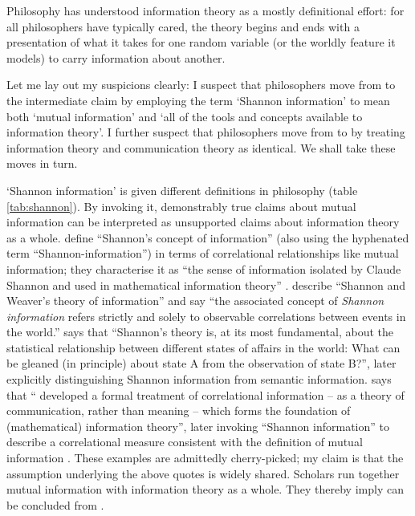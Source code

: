 \documentclass[12pt]{article}
\begin{document}
\begin{myquote}
Philosophy has understood information theory as a mostly definitional effort: for all philosophers have typically cared, the theory begins and ends with a presentation of what it takes for one random variable (or the worldly feature it models) to carry information about another.
\par\hspace*{\fill}\citet[1216]{martinez2019representations}
\end{myquote}

\noindent Let me lay out my suspicions clearly: I suspect that philosophers move from \ami{} to the intermediate claim \ait{} by employing the term `Shannon information' to mean both `mutual information' and `all of the tools and concepts available to information theory'.
I further suspect that philosophers move from \ait{} to \act{} by treating information theory and communication theory as identical.
We shall take these moves in turn.

`Shannon information' is given different definitions in philosophy (table \ref{tab:shannon}).
By invoking it, demonstrably true claims about mutual information can be interpreted as unsupported claims about information theory as a whole.
\citet[$\S$2]{godfrey-smith2016biological} define ``Shannon's concept of information'' (also using the hyphenated term ``Shannon-information'') in terms of correlational relationships like mutual information; they characterise it as ``the sense of information isolated by Claude Shannon and used in mathematical information theory'' \citep[1]{godfrey-smith2016biological}.
\citet[759]{owren2010redefining} describe ``Shannon and Weaver's \parencite*{shannon1949mathematical} theory of information'' and say ``the associated concept of \textit{Shannon information} refers strictly and solely to observable correlations between events in the world.''
\citet[106]{dennett2017bacteria} says that ``Shannon's theory is, at its most fundamental, about the statistical relationship between different states of affairs in the world: What can be gleaned (in principle) about state A from the observation of state B?'', later explicitly distinguishing Shannon information from semantic information.
\citet[p. 12, n. 11]{shea2018representation} says that ``\citet{shannon1948mathematicalc} developed a formal treatment of correlational information -- as a theory of communication, rather than meaning -- which forms the foundation of (mathematical) information theory'', later invoking ``Shannon information'' to describe a correlational measure consistent with the definition of mutual information \citep[p. 78, n. 5]{shea2018representation}.
These examples are admittedly cherry-picked; my claim is that the assumption underlying the above quotes is widely shared.
Scholars run together mutual information with information theory as a whole.
They thereby imply \ait{} can be concluded from \ami{}.
\end{document}
